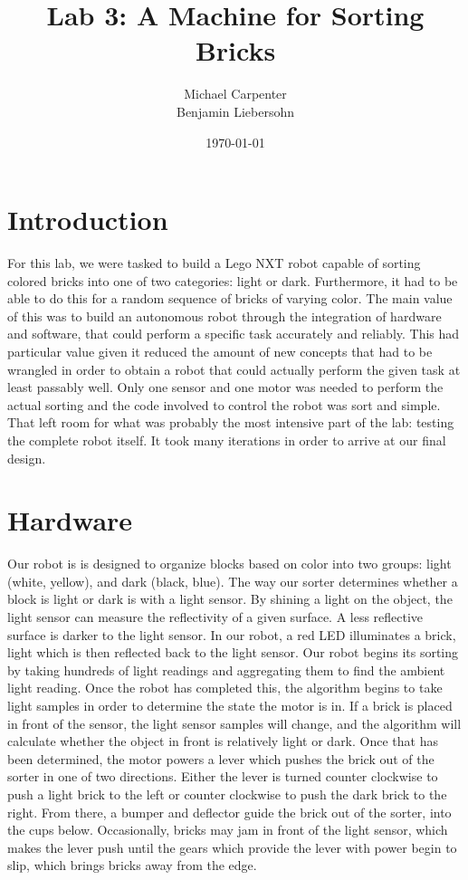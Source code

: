 \documentclass{article}
\title{Lab 3: A Machine for Sorting Bricks}
\author{Michael Carpenter \\ Benjamin Liebersohn}
\date{\today}
\begin{document}
\maketitle

\section{Introduction}
For this lab, we were tasked to build a Lego NXT robot capable of sorting colored bricks into one of two categories: light or dark.
Furthermore, it had to be able to do this for a random sequence of bricks of varying color.
The main value of this was to build an autonomous robot through the integration of hardware and software, that could perform a specific task accurately and reliably.
This had particular value given it reduced the amount of new concepts that had to be wrangled in order to obtain a robot that could actually perform the given task at least passably well.
Only one sensor and one motor was needed to perform the actual sorting and the code involved to control the robot was sort and simple.
That left room for what was probably the most intensive part of the lab: testing the complete robot itself. It took many iterations in order to arrive at our final design.

\section{Hardware}
Our robot is is designed to organize blocks based on color into two groups: light (white, yellow), and dark (black, blue).
The way our sorter determines whether a block is light or dark is with a light sensor.
By shining a light on the object, the light sensor can measure the reflectivity of a given surface.
A less reflective surface is darker to the light sensor.
In our robot, a red LED illuminates a brick, light which is then reflected back to the light sensor.
Our robot begins its sorting by taking hundreds of light readings and aggregating them to find the ambient light reading.
Once the robot has completed this, the algorithm begins to take light samples in order to determine the state the motor is in.
If a brick is placed in front of the sensor, the light sensor samples will change, and the algorithm will calculate whether the object in front is relatively light or dark.
Once that has been determined, the motor powers a lever which pushes the brick out of the sorter in one of two directions.
Either the lever is turned counter clockwise to push a light brick to the left or counter clockwise to push the dark brick to the right.
From there, a bumper and deflector guide the brick out of the sorter, into the cups below.
Occasionally, bricks may jam in front of the light sensor, which makes the lever push until the gears which provide the lever with power begin to slip, which brings bricks away from the edge.
\end{document}
